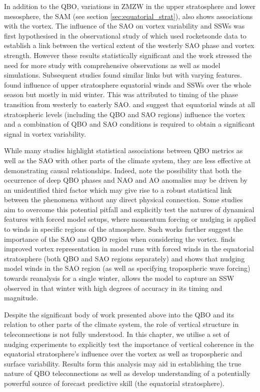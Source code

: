 In addition to the QBO, variations in ZMZW in the upper stratosphere and lower mesosphere, the SAM (see section \ref{sec:equatorial_strat}), also shows associations with the vortex. The influence of the SAO on vortex variability and SSWs was first hypothesised in the observational study of \cite{JGray2001} which used rocketsonde data to establish a link between the vertical extent of the westerly SAO phase and vortex strength. However these results statistically significant and the work stressed the need for more study with comprehensive observations as well as model simulations. Subsequent studies found similar links but with varying features. \cite{Gray2003} found influence of upper stratosphere equatorial winds and SSWs over the whole season but mostly in mid winter. This was attributed to timing of the phase transition from westerly to easterly SAO. \cite{JGray2001} and \cite{Hamilton} suggest that equatorial winds at all stratospheric levels (including the QBO and SAO regions) influence the vortex and a combination of QBO and SAO conditions is required to obtain a significant signal in vortex variability.

While many studies highlight statistical associations between QBO metrics as well as the SAO with other parts of the climate system, they are less effective at demonstrating causal relationships. Indeed, \cite{andrewsObserved2019} note the possibility that both the occurrence of deep QBO phases and NAO and AO anomalies may be driven by an unidentified third factor which may give rise to a robust statistical link between the phenomena without any direct physical connection. Some studies aim to overcome this potential pitfall and explicitly test the natures of dynamical features with forced model setups, where momentum forcing or nudging is applied to winds in specific regions of the atmosphere. Such works further suggest the importance of the SAO and QBO region when considering the vortex. \cite{Pascoe2005} finds improved vortex representation in model runs with forced winds in the equatorial stratosphere (both QBO and SAO regions separately) and \cite{Brown2019} shows that nudging model winds in the SAO region (as well as specifying tropospheric wave forcing) towards reanalysis for a single winter, allows the model to capture an SSW observed in that winter with high degrees of accuracy in its timing and magnitude.   

Despite the significant body of work presented above into the QBO and its relation to other parts of the climate system, the role of vertical structure in teleconnections is not fully understood. In this chapter, we utilise a set of nudging experiments to explicitly test the importance of vertical coherence in the equatorial stratosphere's influence over the vortex as well as tropospheric and surface variability. Results form this analysis may aid in establishing the true nature of QBO teleconnections as well as develop understanding of a potentially powerful source of forecast predictive skill (the equatorial stratosphere).

